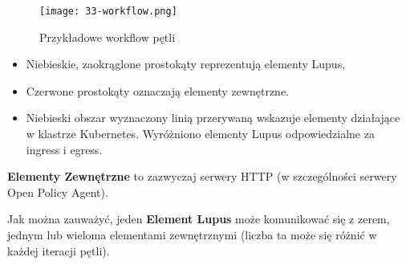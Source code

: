 \begin{figure}[!h]
    \centering \texttt{[image: 33-workflow.png]}
    \caption{Przykładowe workflow pętli}\label{fig:33-workflow}
\end{figure}

\begin{itemize}
    \item Niebieskie, zaokrąglone prostokąty reprezentują elementy Lupus,
    \item Czerwone prostokąty oznaczają elementy zewnętrzne.
    \item Niebieski obszar wyznaczony linią przerywaną wskazuje elementy działające w klastrze Kubernetes. Wyróżniono elementy Lupus odpowiedzialne za ingress i egress.
\end{itemize}

\textbf{Elementy Zewnętrzne} to zazwyczaj serwery HTTP (w szczególności serwery Open Policy Agent).

Jak można zauważyć, jeden \textbf{Element Lupus} może komunikować się z zerem, jednym lub wieloma elementami zewnętrznymi (liczba ta może się różnić w każdej iteracji pętli).
